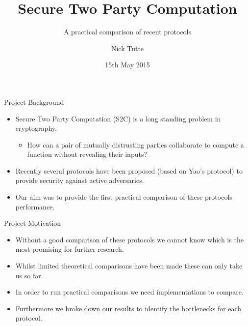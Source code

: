 \documentclass[t, 12pt]{beamer}            %
\title[Secure Two Party Computation]{Secure Two Party Computation}
\subtitle{A practical comparison of recent protocols}
\author{Nick Tutte}
\institute{University of Bristol}
\date{15th May 2015}
\begin{document}
\titlepage


\begin{frame}{Project Background}
	\begin{itemize} %
		\item Secure Two Party Computation (S2C) is a long standing problem in cryptography.
		\begin{itemize}
			\item How can a pair of mutually distrusting parties collaborate to compute a function without revealing their inputs?
		\end{itemize}
		\item Recently several protocols have been proposed (based on Yao's protocol) to provide security against active adversaries.
		\item Our aim was to provide the first practical comparison of these protocols performance.
	\end{itemize}
\end{frame}


\begin{frame}{Project Motivation}
	\begin{itemize} %
		\item Without a good comparison of these protocols we cannot know which is the most promising for further research.
		\item Whilst limited theoretical comparisons have been made these can only take us so far.
		\item In order to run practical comparisons we need implementations to compare.
		\item Furthermore we broke down our results to identify the bottlenecks for each protocol.
	\end{itemize}
\end{frame}
\end{document}
